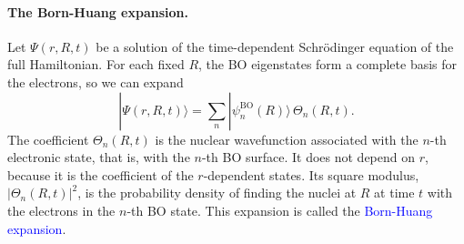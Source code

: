 \documentclass[11pt]{article}      %
\numberwithin{equation}{section}   %
\begin{document}
\paragraph{The Born-Huang expansion.}
Let $\Psi(r,R,t)$ be a solution of the time-dependent Schr\"odinger equation
of the full Hamiltonian. For each fixed $R$, the BO eigenstates form a
complete basis for the electrons, so we can expand
\begin{equation}
    \boxed{|\Psi(r,R,t)\rangle
    = \sum_n |\psi^{\mathrm{BO}}_n(R)\rangle\,\Theta_n(R,t).}
\end{equation}
The coefficient $\Theta_n(R,t)$ is the nuclear wavefunction associated with the
$n$-th electronic state, that is, with the $n$-th BO surface. It does not
depend on $r$, because it is the coefficient of the $r$-dependent states. Its
square modulus, $|\Theta_n(R,t)|^2$, is the probability density of finding the
nuclei at $R$ at time $t$ with the electrons in the $n$-th BO state. This expansion is called the
\textcolor{blue}{Born-Huang expansion}.
\end{document}
